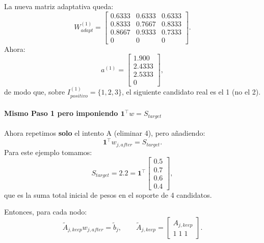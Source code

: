 \documentclass[11pt,a4paper]{article}
\begin{document}
La nueva matriz adaptativa queda:
\[
W_{adapt}^{(1)}=
\begin{bmatrix}
0.6333&0.6333&0.6333\\
0.8333&0.7667&0.8333\\
0.8667&0.9333&0.7333\\
0&0&0
\end{bmatrix}.
\]
Ahora:
\[
a^{(1)}=
\begin{bmatrix}
1.900\\2.4333\\2.5333\\0
\end{bmatrix},
\]
de modo que, sobre $I_{positivo}^{(1)}=\{1,2,3\}$, el siguiente candidato real es
el 1 (no el 2).

\paragraph{Mismo Paso 1 pero imponiendo \texorpdfstring{$\mathbf 1^\top w=S_{target}$}{1^T w = S_target}}
Ahora repetimos \textbf{solo} el intento A (eliminar 4), pero añadiendo:
\[
\mathbf 1^\top w_{j,after}=S_{target}.
\]
Para este ejemplo tomamos:
\[
S_{target}=2.2=\mathbf 1^\top
\begin{bmatrix}
0.5\\0.7\\0.6\\0.4
\end{bmatrix},
\]
que es la suma total inicial de pesos en el soporte de 4 candidatos.

Entonces, para cada nodo:
\[
\widetilde A_{j,keep}w_{j,after}=\widetilde b_j,\qquad
\widetilde A_{j,keep}=
\begin{bmatrix}
A_{j,keep}\\
1\;1\;1
\end{bmatrix}.
\]
\end{document}
